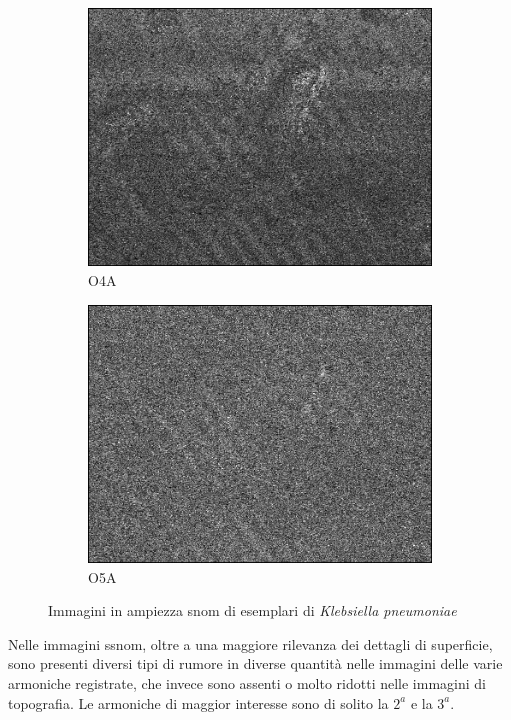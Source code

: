 \documentclass[../main.tex]{subfiles}
\begin{document}
\begin{figure}[ht]
\begin{subfigure}{0.3\linewidth}
		\includegraphics[keepaspectratio, width=\linewidth]{images/kp_o4a.png}
		\caption{O4A}
	\end{subfigure}
	\begin{subfigure}{0.3\linewidth}
		\centering
		\includegraphics[keepaspectratio, width=\linewidth]{images/kp_o5a.png}
		\caption{O5A}
	\end{subfigure}
	\caption[Immagini in ampiezza SNOM di esemplari di \textit{Klebsiella pneumoniae}]{
		Immagini in ampiezza \acrshort{snom} di esemplari di \textit{Klebsiella pneumoniae} \cite{ssnombacter_data}}
\end{figure}

Nelle immagini \acrshort{ssnom}, oltre a una maggiore rilevanza dei dettagli di superficie, sono presenti diversi tipi di rumore in diverse quantità nelle immagini delle varie armoniche registrate, che invece sono assenti o molto ridotti nelle immagini di topografia. Le armoniche di maggior interesse sono di solito la $2^a$ e la $3^a$.
\end{document}
